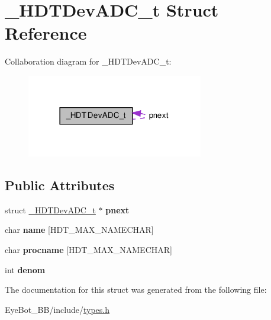 \hypertarget{struct___h_d_t_dev_a_d_c__t}{\section{\-\_\-\-H\-D\-T\-Dev\-A\-D\-C\-\_\-t \-Struct \-Reference}
\label{struct___h_d_t_dev_a_d_c__t}
}


\-Collaboration diagram for \-\_\-\-H\-D\-T\-Dev\-A\-D\-C\-\_\-t\-:\nopagebreak
\begin{figure}[H]
\begin{center}
\leavevmode
\includegraphics[width=218pt]{struct___h_d_t_dev_a_d_c__t__coll__graph}
\end{center}
\end{figure}
\subsection*{\-Public \-Attributes}
\begin{DoxyCompactItemize}
\item 
\hypertarget{struct___h_d_t_dev_a_d_c__t_aa127e38345dfc6cbc40aa55b6ff99387}{struct \hyperlink{struct___h_d_t_dev_a_d_c__t}{\-\_\-\-H\-D\-T\-Dev\-A\-D\-C\-\_\-t} $\ast$ {\bfseries pnext}}\label{struct___h_d_t_dev_a_d_c__t_aa127e38345dfc6cbc40aa55b6ff99387}

\item 
\hypertarget{struct___h_d_t_dev_a_d_c__t_a487547ef9f7be3fa42b6b1b102877ddc}{char {\bfseries name} \mbox{[}\-H\-D\-T\-\_\-\-M\-A\-X\-\_\-\-N\-A\-M\-E\-C\-H\-A\-R\mbox{]}}\label{struct___h_d_t_dev_a_d_c__t_a487547ef9f7be3fa42b6b1b102877ddc}

\item 
\hypertarget{struct___h_d_t_dev_a_d_c__t_a73cd3db06e93dbe784d5c39c2c0efdaf}{char {\bfseries procname} \mbox{[}\-H\-D\-T\-\_\-\-M\-A\-X\-\_\-\-N\-A\-M\-E\-C\-H\-A\-R\mbox{]}}\label{struct___h_d_t_dev_a_d_c__t_a73cd3db06e93dbe784d5c39c2c0efdaf}

\item 
\hypertarget{struct___h_d_t_dev_a_d_c__t_a1dd368e81f85b2c8b86b46617e80303a}{int {\bfseries denom}}\label{struct___h_d_t_dev_a_d_c__t_a1dd368e81f85b2c8b86b46617e80303a}

\end{DoxyCompactItemize}


\-The documentation for this struct was generated from the following file\-:\begin{DoxyCompactItemize}
\item 
\-Eye\-Bot\-\_\-\-B\-B/include/\hyperlink{types_8h}{types.\-h}\end{DoxyCompactItemize}
